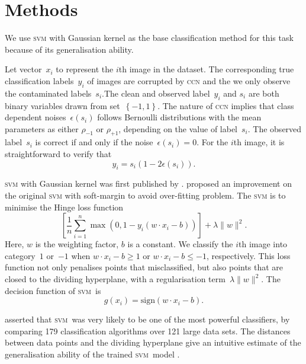 \documentclass[12pt]{article} %
\newcommand{\svm}{\textsc{svm}}
\newcommand{\rhoo}{\rho_{+1}}
\newcommand{\rhoz}{\rho_{-1}}
\begin{document}
\section{Methods}\label{method}
We use \textsc{svm} with Gaussian kernel as the base classification method for this task because of its generalisation ability.

Let vector~$x_i$ to represent the $i$th image in the dataset. The corresponding true classification labels~$y_i$ of images are corrupted by \textsc{ccn} and the we only observe the contaminated labels~$s_i$.The clean and observed label~$y_i$ and $s_i$ are both binary variables drawn from set~$\left\{-1,1\right\}$.  The nature of \textsc{ccn} implies that class dependent noises~$\epsilon(s_i)$ follows Bernoulli distributions with the mean parameters as either $\rhoz$ or $\rhoo$, depending on the value of label~$s_i$. The observed label~$s_i$ is correct if and only if the noise~$\epsilon(s_i)=0$. For the $i$th image, it is straightforward to verify that
\begin{equation} \label{eq:noise}
y_i=s_i(1-2\epsilon(s_i)).
\end{equation}

\textsc{svm} with Gaussian kernel was first published by \citet{Boser:1992:TAO:130385.130401}.
\citet{Cortes1995} proposed an improvement on the original \textsc{svm} with soft-margin  to  avoid over-fitting problem. The \textsc{svm} is to minimise the Hinge loss function
\begin{equation*}
\left[{\frac {1}{n}}\sum _{i=1}^{n}\max \left(0,1-y_{i}(w\cdot x_{i}-b)\right)\right]+\lambda \lVert w\rVert ^{2}.
\end{equation*}
Here, $w$ is the weighting factor, $b$ is a constant. We classify the $i$th image into category~$1$ or~$-1$ when $w\cdot x_{i}-b\geq1$ or $w\cdot x_{i}-b\leq-1$, respectively. This loss function not only penalises points that misclassified, but also points that are closed to the dividing hyperplane, with a regularisation term~$\lambda \lVert w\rVert ^{2}$. The decision function of \svm\ is
\begin{equation}\label{eq:decision}
 g(x_{i})=\text{sign}(w\cdot x_{i}-b).
\end{equation}

\citet{Fernandez-Delgado:2014:WNH:2627435.2697065} asserted that \svm\ was very likely to be one of the most powerful classifiers, by comparing 179 classification algorithms over 121 large data sets. The distances between data points and the dividing hyperplane give an intuitive estimate of the generalisation ability of the trained \svm\ model \citep{hastie01statisticallearning}.
\end{document}
